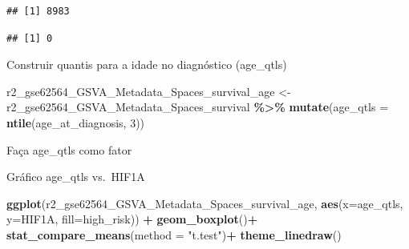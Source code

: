 \documentclass[
]{book}
\newenvironment{Shaded}{\begin{snugshade}}{\end{snugshade}}
\newcommand{\AttributeTok}[1]{\textcolor[rgb]{0.13,0.29,0.53}{#1}}
\newcommand{\DecValTok}[1]{\textcolor[rgb]{0.00,0.00,0.81}{#1}}
\newcommand{\FunctionTok}[1]{\textcolor[rgb]{0.13,0.29,0.53}{\textbf{#1}}}
\newcommand{\NormalTok}[1]{#1}
\newcommand{\OtherTok}[1]{\textcolor[rgb]{0.56,0.35,0.01}{#1}}
\newcommand{\SpecialCharTok}[1]{\textcolor[rgb]{0.81,0.36,0.00}{\textbf{#1}}}
\newcommand{\StringTok}[1]{\textcolor[rgb]{0.31,0.60,0.02}{#1}}
\begin{document}
\begin{verbatim}
## [1] 8983
\end{verbatim}

\begin{Shaded}
\end{Shaded}

\begin{verbatim}
## [1] 0
\end{verbatim}

Construir quantis para a idade no diagnóstico (age\_qtls)

\begin{Shaded}
\begin{Highlighting}[]
\NormalTok{r2\_gse62564\_GSVA\_Metadata\_Spaces\_survival\_age }\OtherTok{\textless{}{-}}\NormalTok{ r2\_gse62564\_GSVA\_Metadata\_Spaces\_survival }\SpecialCharTok{\%\textgreater{}\%}
    \FunctionTok{mutate}\NormalTok{(}\AttributeTok{age\_qtls =} \FunctionTok{ntile}\NormalTok{(age\_at\_diagnosis, }\DecValTok{3}\NormalTok{))}
\end{Highlighting}
\end{Shaded}

Faça age\_qtls como fator

\begin{Shaded}
\end{Shaded}

Gráfico age\_qtls vs.~HIF1A

\begin{Shaded}
\begin{Highlighting}[]
\FunctionTok{ggplot}\NormalTok{(r2\_gse62564\_GSVA\_Metadata\_Spaces\_survival\_age, }\FunctionTok{aes}\NormalTok{(}\AttributeTok{x=}\NormalTok{age\_qtls, }\AttributeTok{y=}\NormalTok{HIF1A, }\AttributeTok{fill=}\NormalTok{high\_risk)) }\SpecialCharTok{+} 
    \FunctionTok{geom\_boxplot}\NormalTok{()}\SpecialCharTok{+}
  \FunctionTok{stat\_compare\_means}\NormalTok{(}\AttributeTok{method =} \StringTok{"t.test"}\NormalTok{)}\SpecialCharTok{+}
  \FunctionTok{theme\_linedraw}\NormalTok{()}
\end{Highlighting}
\end{Shaded}
\end{document}
